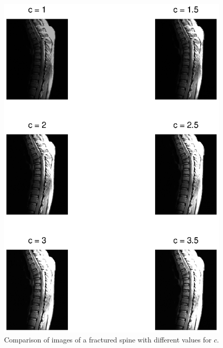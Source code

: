 \begin{figure}[!Htb]
  \centering
  \includegraphics[width=\textwidth]{fracturedSpines.eps}
  \caption{Comparison of images of a fractured spine with different values for \(c\).}
  \label{fig:fractured_spines}
\end{figure}

